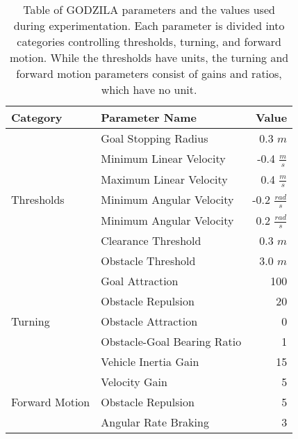 \begin{table}
  \centering
  \begin{tabularx}{\textwidth}{|l|X||r|}
    \hline
    \textbf{Category} & \textbf{Parameter Name}  & \textbf{Value}               \\  \hline\hline
    \multirow{7}{*}{Thresholds}     & Goal Stopping Radius         &   0.3  $m$             \\ 
                                    & Minimum Linear Velocity      &  -0.4  $\frac{m}{s}$   \\  
                                    & Maximum Linear Velocity      &   0.4  $\frac{m}{s}$   \\  
                                    & Minimum Angular Velocity     &  -0.2  $\frac{rad}{s}$ \\  
                                    & Minimum Angular Velocity     &   0.2  $\frac{rad}{s}$ \\  
                                    & Clearance Threshold          &   0.3  $m$ \\  
                                    & Obstacle Threshold           &   3.0  $m$ \\  \hline
    \multirow{5}{*}{Turning}        & Goal Attraction              &   100   \\  
                                    & Obstacle Repulsion           &   20    \\  
                                    & Obstacle Attraction          &   0     \\  
                                    & Obstacle-Goal Bearing Ratio  &   1     \\  
                                    & Vehicle Inertia Gain         &   15    \\  \hline
    \multirow{3}{*}{Forward Motion} & Velocity Gain                &   5     \\  
                                    & Obstacle Repulsion           &   5     \\  
                                    & Angular Rate Braking         &   3     \\  \hline
  \end{tabularx} 
  
  \caption{Table of GODZILA parameters and the values used during experimentation.
           Each parameter is divided into categories controlling thresholds, turning, and
           forward motion. While the thresholds have units, the turning and forward motion
           parameters consist of gains and ratios, which have no unit.}
  \label{tab:nav_params1}
\end{table}

